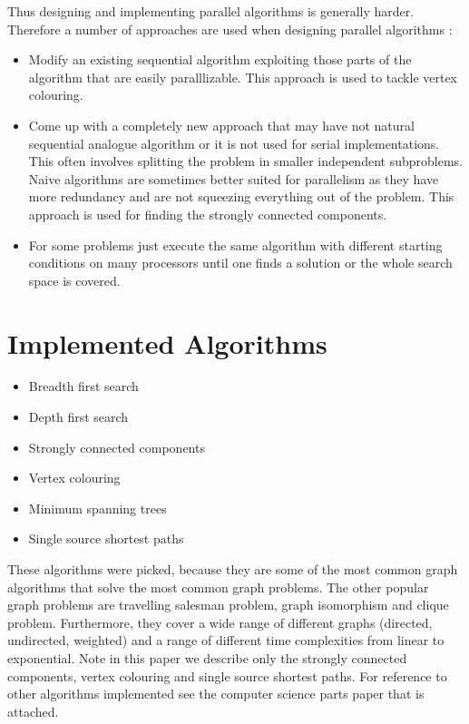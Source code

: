\documentclass{report}
\theoremstyle{plain}
\theoremstyle{definition}
\theoremstyle{remark}
\numberwithin{definition}{chapter}
\numberwithin{example}{chapter}
\numberwithin{figure}{chapter}
\numberwithin{theorem}{chapter}
\numberwithin{lemma}{chapter}
\begin{document}
Thus designing and implementing parallel algorithms is generally harder. Therefore a number of approaches are used when designing parallel algorithms \cite{berman1996fundamentals}:
\begin{itemize}
  \item Modify an existing sequential algorithm exploiting those parts of the algorithm that are easily paralllizable. This approach is used to tackle vertex colouring.
  \item Come up with a completely new approach that may have not natural sequential analogue algorithm or it is not used for serial implementations. This often involves splitting the problem in smaller independent subproblems. Naive algorithms are sometimes better suited for parallelism as they have more redundancy and are not squeezing everything out of the problem. This approach is used for finding the strongly connected components.
  \item For some problems just execute the same algorithm with different starting conditions on many processors until one finds a solution or the whole search space is covered.
\end{itemize}

\section{Implemented Algorithms}
\begin{itemize}
  \item Breadth first search
  \item Depth first search
  \item Strongly connected components
  \item Vertex colouring
  \item Minimum spanning trees
  \item Single source shortest paths
\end{itemize}

These algorithms were picked, because they are some of the most common graph algorithms that solve the most common graph problems. The other popular graph problems are travelling salesman problem, graph isomorphism and clique problem. Furthermore, they cover a wide range of different graphs (directed, undirected, weighted) and a range of different time complexities from linear to exponential. Note in this paper we describe only the strongly connected components, vertex colouring and single source shortest paths. For reference to other algorithms implemented see the computer science parts paper that is attached.
\end{document}
